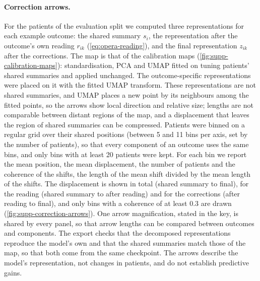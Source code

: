 \paragraph{Correction arrows.} For the patients of the evaluation split we
computed three representations for each example outcome: the shared summary
$s_i$, the representation after the outcome's own reading $r_{ik}$
(\cref{eq:opera-reading}), and the final representation $z_{ik}$ after the
corrections. The map is that of the calibration maps
(\cref{fig:supp-calibration-maps}): standardisation, PCA and UMAP fitted on
tuning patients' shared summaries and applied unchanged. The outcome-specific
representations were placed on it with the fitted UMAP transform. These
representations are not shared summaries, and UMAP places a new point by its
neighbours among the fitted points, so the arrows show local direction and
relative size; lengths are not comparable between distant regions of the map,
and a displacement that leaves the region of shared summaries can be
compressed. Patients were binned on a regular grid over their shared
positions (between 5 and 11 bins per axis, set by the number of patients), so
that every component of an outcome uses the same bins, and only bins with at
least 20 patients were kept. For each bin we report the mean position, the mean
displacement, the number of patients and the coherence of the shifts, the length
of the mean shift divided by the mean length of the shifts. The displacement is
shown in total (shared summary to final), for the reading (shared summary to
after reading) and for the corrections (after reading to final), and only bins
with a coherence of at least 0.3 are drawn (\cref{fig:supp-correction-arrows}).
One arrow magnification, stated in the key, is shared by every panel, so that
arrow lengths can be compared between outcomes and components. The export checks
that the decomposed representations reproduce the model's own and that the
shared summaries match those of the map, so that both come from the same
checkpoint. The arrows describe the model's representation, not changes in
patients, and do not establish predictive gains.

